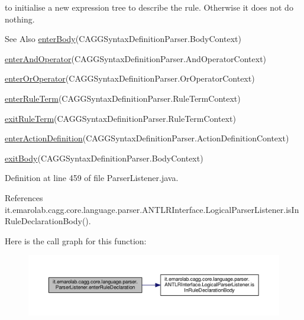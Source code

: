  to initialise a new expression tree to describe the rule. Otherwise it does not do nothing. \begin{DoxySeeAlso}{See Also}
\hyperlink{classit_1_1emarolab_1_1cagg_1_1core_1_1language_1_1parser_1_1ParserListener_a9675dd98156b94a9e26cea3946eaa69d}{enter\-Body}(C\-A\-G\-G\-Syntax\-Definition\-Parser.\-Body\-Context) 

\hyperlink{classit_1_1emarolab_1_1cagg_1_1core_1_1language_1_1parser_1_1ParserListener_a27394515e7347376dc937974202abbc9}{enter\-And\-Operator}(C\-A\-G\-G\-Syntax\-Definition\-Parser.\-And\-Operator\-Context) 

\hyperlink{classit_1_1emarolab_1_1cagg_1_1core_1_1language_1_1parser_1_1ParserListener_a0c20b78d0166b7fe8cf816764d9c7c86}{enter\-Or\-Operator}(C\-A\-G\-G\-Syntax\-Definition\-Parser.\-Or\-Operator\-Context) 

\hyperlink{classit_1_1emarolab_1_1cagg_1_1core_1_1language_1_1parser_1_1ParserListener_ab55244dd0bc74c42338389ef4f186963}{enter\-Rule\-Term}(C\-A\-G\-G\-Syntax\-Definition\-Parser.\-Rule\-Term\-Context) 

\hyperlink{classit_1_1emarolab_1_1cagg_1_1core_1_1language_1_1parser_1_1ParserListener_a9cddde49b7fd2142b1fcd72b5d6e2c51}{exit\-Rule\-Term}(C\-A\-G\-G\-Syntax\-Definition\-Parser.\-Rule\-Term\-Context) 

\hyperlink{classit_1_1emarolab_1_1cagg_1_1core_1_1language_1_1parser_1_1ParserListener_a95c6463441d582fef5d63aea4eb13f56}{enter\-Action\-Definition}(C\-A\-G\-G\-Syntax\-Definition\-Parser.\-Action\-Definition\-Context) 

\hyperlink{classit_1_1emarolab_1_1cagg_1_1core_1_1language_1_1parser_1_1ParserListener_a4ddc07fbccb866fee058db32839fba42}{exit\-Body}(C\-A\-G\-G\-Syntax\-Definition\-Parser.\-Body\-Context) 
\end{DoxySeeAlso}


Definition at line 459 of file Parser\-Listener.\-java.



References it.\-emarolab.\-cagg.\-core.\-language.\-parser.\-A\-N\-T\-L\-R\-Interface.\-Logical\-Parser\-Listener.\-is\-In\-Rule\-Declaration\-Body().



Here is the call graph for this function\-:\nopagebreak
\begin{figure}[H]
\begin{center}
\leavevmode
\includegraphics[width=350pt]{classit_1_1emarolab_1_1cagg_1_1core_1_1language_1_1parser_1_1ParserListener_a23734ed11648eae22a037a43e8c2d007_cgraph}
\end{center}
\end{figure}


